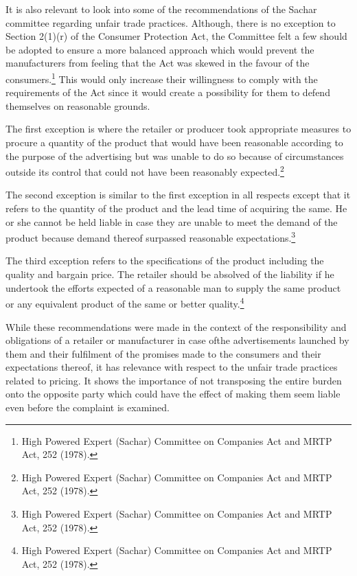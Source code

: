 \begin{multicols}{2}
\vspace{-.15cm}

\noi
It is also relevant to look into some of the recommendations of the Sachar committee regarding
unfair trade practices. Although, there is no exception to Section 2(1)(r) of the Consumer
Protection Act, the Committee felt a few should be adopted to ensure a more balanced approach
which would prevent the manufacturers from feeling that the Act was skewed in the favour of
the consumers.\footnote{High Powered Expert (Sachar) Committee on Companies Act and MRTP Act, 252 (1978).} This would only increase their willingness to comply with the requirements
of the Act since it would create a possibility for them to defend themselves on reasonable
grounds.

\vspace{-.15cm}

\noi
The first exception is where the retailer or producer took appropriate measures to procure a
quantity of the product that would have been reasonable according to the purpose of the
advertising but was unable to do so because of circumstances outside its control that could not
have been reasonably expected.\footnote{High Powered Expert (Sachar) Committee on Companies Act and MRTP Act, 252 (1978).}

\noi
The second exception is similar to the first exception in all respects except that it refers to the
quantity of the product and the lead time of acquiring the same. He or she cannot be held liable
in case they are unable to meet the demand of the product because demand thereof surpassed
reasonable expectations.\footnote{High Powered Expert (Sachar) Committee on Companies Act and MRTP Act, 252 (1978).}

\noi
The third exception refers to the specifications of the product including the quality and bargain
price. The retailer should be absolved of the liability if he undertook the efforts expected of a
reasonable man to supply the same product or any equivalent product of the same or better
quality.\footnote{High Powered Expert (Sachar) Committee on Companies Act and MRTP Act, 252 (1978).}

\noi
While these recommendations were made in the context of the responsibility and obligations of a retailer or manufacturer in case ofthe advertisements launched by them and their fulfilment of the promises made to the consumers and their expectations thereof, it has relevance with respect to the unfair trade practices related to pricing. It shows the importance of not transposing the entire burden onto the opposite party which could have the effect of making them seem liable even before the complaint is examined.


\end{multicols}
